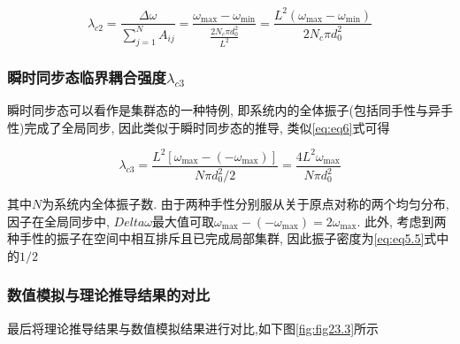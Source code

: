 \documentclass{article}
\begin{document}
\begin{equation}\label{eq:eq6}
	\lambda _{c2}=\frac{\Delta \omega}{\sum_{j=1}^N{A_{ij}}}=\frac{\omega _{\max}-\omega _{\min}}{\frac{2N_c\pi d_{0}^{2}}{L^2}}=\frac{L^2\left( \omega _{\max}-\omega _{\min} \right)}{2N_c\pi d_{0}^{2}}
\end{equation}

\subsubsection{瞬时同步态临界耦合强度$\lambda_{c3}$}

瞬时同步态可以看作是集群态的一种特例, 即系统内的全体振子(包括同手性与异手性)完成了全局同步, 因此类似于瞬时同步态的推导, 类似\ref{eq:eq6}式可得

\begin{equation}\label{eq:eq7}
	\lambda _{c3}=\frac{L^2\left[ \omega _{\max}-\left( -\omega _{\max} \right) \right]}{N\pi d_{0}^{2}/2}=\frac{4L^2\omega _{\max}}{N\pi d_{0}^{2}}
\end{equation}

其中$N$为系统内全体振子数. 由于两种手性分别服从关于原点对称的两个均匀分布, 因子在全局同步中, $Delta \omega$最大值可取$\omega _{\max}-\left( -\omega _{\max} \right)=2\omega _{\max}$. 此外, 考虑到两种手性的振子在空间中相互排斥且已完成局部集群, 因此振子密度为\ref{eq:eq5.5}式中的$1/2$


\subsubsection{数值模拟与理论推导结果的对比}

最后将理论推导结果与数值模拟结果进行对比,如下图\ref{fig:fig23.3}所示
\end{document}
